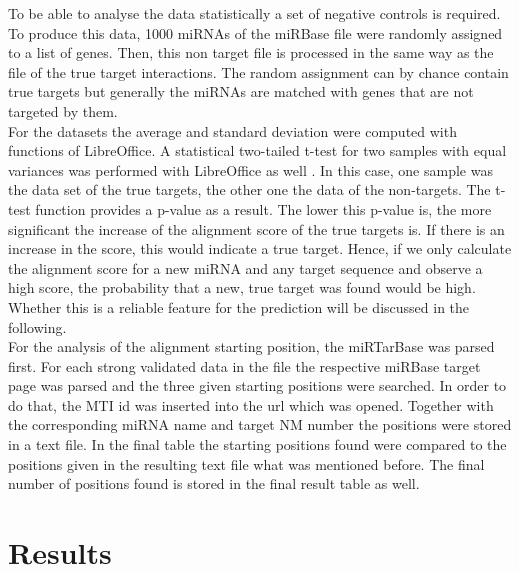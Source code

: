 \documentclass[12pt,  a4paper]{report}
\begin{document}
To be able to analyse the data statistically a set of negative controls is required. To produce this data, 1000 miRNAs of the miRBase file were randomly assigned to a list of genes. Then, this non target file is processed in the same way as the file of the true target interactions. The random assignment can by chance contain true targets but generally the miRNAs are matched with genes that are not targeted by them. \\

For the datasets the average and standard deviation were computed with functions of LibreOffice. A statistical two-tailed t-test for two samples with equal variances was performed with LibreOffice as well \cite{ttest}. In this case, one sample was the data set of the true targets, the other one the data of the non-targets. The t-test function provides a p-value as a result. The lower this p-value is, the more significant the increase of the alignment score of the true targets is. If there is an increase in the score, this would indicate a true target. Hence, if we only calculate the alignment score for a new miRNA and any target sequence and observe a high score, the probability that a new, true target was found would be high. Whether this is a reliable feature for the prediction will be discussed in the following.\\

For the analysis of the alignment starting position, the miRTarBase was parsed first. For each strong validated data in the file the respective miRBase target page was parsed and the three given starting positions were searched. In order to do that, the MTI id was inserted into the url which was opened. Together with the corresponding miRNA name and target NM number the positions were stored in a text file. In the final table the starting positions found were compared to the positions given in the resulting text file what was mentioned before. The final number of positions found is stored in the final result table as well. 



\vspace{1cm}



\chapter{Results}
\label{chapter:results}
\end{document}
